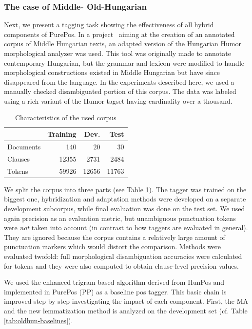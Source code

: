 \subsubsection{The case of Middle- Old-Hungarian}
\label{sec:oldhungarian}

Next, we present a tagging task showing the effectiveness of all hybrid components of PurePos. 
In a project~\cite{Novak2013} aiming at the creation of an annotated corpus of Middle Hungarian texts, an adapted version of the Hungarian Humor morphological analyzer was used. 
This tool was originally made to annotate contemporary Hungarian, but the grammar and lexicon were modified to handle morphological constructions existed in Middle Hungarian but have since disappeared from the language. 
In the experiments described here, we used a manually checked disambiguated portion of this corpus. The data was labeled using a rich variant of the Humor tagset having cardinality over a thousand.

\begin{table}[H]
\centering
\caption{Characteristics of the used corpus}\label{tab:oldhun-corpus}
\begin{tabular}{l r r r}
\hline
& Training & Dev. & Test \\
\hline
Documents & 140 & 20 & 30 \\
Clauses & 12355 & 2731 & 2484 \\
Tokens & 59926 & 12656 &  11763\\
\hline
\end{tabular}
\end{table}

We split the corpus into three parts (see Table \ref{tab:oldhun-corpus}). 
The tagger was trained on the biggest one, hybridization and adaptation methods were developed on a separate development subcorpus, while final evaluation was done on the test set.
We used again precision as an evaluation metric, but unambiguous punctuation tokens were \emph{not} taken into account (in contrast to how taggers are evaluated in general). 
They are ignored because the corpus contains a relatively large amount of punctuation markers which would distort the comparison.
Methods were evaluated twofold: full morphological disambiguation accuracies were calculated for tokens and they were also computed to obtain clause-level precision values.

We used the enhanced trigram-based algorithm derived from HunPos and implemented in PurePos (PP) as a baseline \gls{pos} tagger. 
This basic chain is improved step-by-step investigating the impact of each component.
First, the MA and the new lemmatization method is analyzed on the development set (cf. Table \ref{tab:oldhun-baselines}). 

